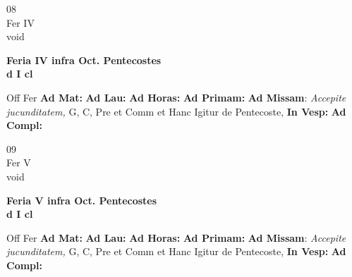 \documentclass[10pt, openany]{book}
\begin{document}
    \begin{center}
        \begin{minipage}{3.5in}
            \vspace{2em}
            \begin{minipage}{0.5in}
                {\Huge 08} \\
                {\normalsize Fer IV} \\
                {\normalsize void}
            \end{minipage}
            \begin{minipage}{3.0in}
                \textbf{ \large Feria IV infra Oct. Pentecostes \\
                \textnormal{\normalsize d I cl}} \\ 
            \end{minipage}
            \begin{justify}Off Fer
                \textbf{Ad Mat: }
                \textbf{Ad Lau: }
                \textbf{Ad Horas: }
                \textbf{Ad Primam: }\textbf{Ad Missam}: \textit{Accepite jucunditatem,} G, C, Pre et Comm et Hanc Igitur de Pentecoste,  
                \textbf{In Vesp: }
                \textbf{Ad Compl: }
            \end{justify}
        \end{minipage}
    \end{center}

    \begin{center}
        \begin{minipage}{3.5in}
            \vspace{2em}
            \begin{minipage}{0.5in}
                {\Huge 09} \\
                {\normalsize Fer V} \\
                {\normalsize void}
            \end{minipage}
            \begin{minipage}{3.0in}
                \textbf{ \large Feria V infra Oct. Pentecostes \\
                \textnormal{\normalsize d I cl}} \\ 
            \end{minipage}
            \begin{justify}Off Fer
                \textbf{Ad Mat: }
                \textbf{Ad Lau: }
                \textbf{Ad Horas: }
                \textbf{Ad Primam: }\textbf{Ad Missam}: \textit{Accepite jucunditatem,} G, C, Pre et Comm et Hanc Igitur de Pentecoste,  
                \textbf{In Vesp: }
                \textbf{Ad Compl: }
            \end{justify}
        \end{minipage}
    \end{center}
\end{document}
